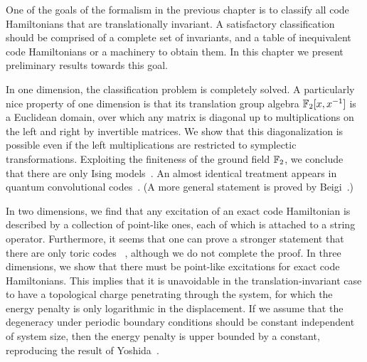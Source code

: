 
One of the goals of the formalism in the previous chapter
is to classify all code Hamiltonians that are translationally invariant.
A satisfactory classification should be 
comprised of a complete set of invariants,
and a table of inequivalent code Hamiltonians or a machinery to obtain them.
In this chapter we present preliminary results towards this goal.

In one dimension, the classification problem is completely solved.
A particularly nice property of one dimension is
that its translation group algebra $\mathbb{F}_2[x,x^{-1}]$ is a Euclidean domain,
over which any matrix is diagonal 
up to multiplications on the left and right by invertible matrices.
We show that this diagonalization is possible
even if the left multiplications are restricted to symplectic transformations.
Exploiting the finiteness of the ground field $\mathbb{F}_2$,
we conclude that there are only Ising models~\cite{Yoshida2011Classification}.
An almost identical treatment appears in quantum convolutional
codes~\cite{OllivierTillich2004Convolutional,GrasslRotteler2006Convolutional}.
(A more general statement is proved by Beigi~\cite{Beigi2012OneDimension}.)

In two dimensions, we find that 
any excitation of an exact code Hamiltonian 
is described by a collection of point-like ones,
each of which is attached to a string operator.
Furthermore, it seems that one can prove a stronger statement that there are only toric codes%
~\cite{Yoshida2011Classification,BombinDuclosCianciPoulin2012}, 
although we do not complete the proof.
In three dimensions, we show that there must be point-like excitations for exact code Hamiltonians.
This implies that it is unavoidable in the translation-invariant case
to have a topological charge penetrating through the system,
for which the energy penalty is only logarithmic in the displacement.
If we assume that the degeneracy under periodic boundary conditions should be constant independent of system size,
then the energy penalty is upper bounded by a constant,
reproducing the result of Yoshida~\cite{Yoshida2011feasibility}.



